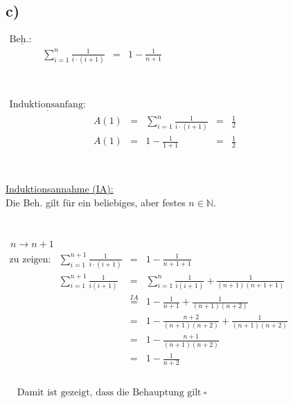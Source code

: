 \documentclass[a4paper]{scrartcl}
\newcommand{\qed}{\ \square}
\begin{document}
	\subsection{c)}
		\(		
		\begin{array}{llcl}
			\underline{\text{Beh.: }}& \\
				&\sum\limits_{i=1}^{n}\frac{1}{i\cdot(i+1)}&=&1-\frac{1}{n+1}\\
		\end{array}
		\)\\ \\ \\
		\(
		\begin{array}{llclcl}
			\underline{\text{Induktionsanfang:}}& \\
				&A(1)&=&\sum\limits_{i=1}^{n}\frac{1}{i\cdot(i+1)}&=&\frac{1}{2}\\
				&A(1)&=&1-\frac{1}{1+1}&=&\frac{1}{2}\\
		\end{array}
		\)\\ \\ \\
		\underline{Induktionsannahme (IA):}\\
		Die Beh. gilt für ein beliebiges, aber festes \(n\in\mathbb{N}\).\\ \\ \\
		\underline{}\ \(n\rightarrow n+1\) \\
		\(
		\begin{array}{llclcl}
			\text{zu zeigen:} & \sum\limits_{i=1}^{n+1}\frac{1}{i\cdot(i+1)}&=&1-\frac{1}{n+1+1}\\
			& \sum\limits_{i=1}^{n+1}\frac{1}{i(i+1)}&=&\sum\limits_{i=1}^{n}\frac{1}
				{i(i+1)}+\frac{1}
				{(n+1)(n+1+1)}\\
			& &\overset{IA}{=}&1-\frac{1}{n+1}+\frac{1}{(n+1)(n+2)}\\
			& &=&1-\frac{n+2}{(n+1)(n+2)}+\frac{1}{(n+1)(n+2)}\\
			& &=&1-\frac{n+1}{(n+1)(n+2)}\\
			& &=&1-\frac{1}{n+2}\\
		\end{array}
		\)\\ \\ 
		\(
		\begin{array}{lcl}
			&\text{Damit ist gezeigt, dass die Behauptung gilt}\qed \\
		\end{array}
		\)
				
\end{document}
